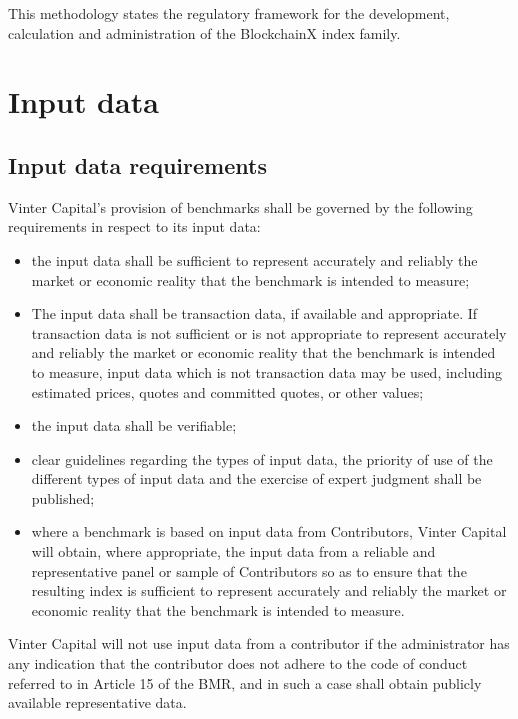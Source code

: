 \documentclass{article}
\begin{document}

This methodology states the regulatory framework for the development, calculation and administration of the BlockchainX index family.

\section{Input data}
\subsection{Input data requirements}
Vinter Capital’s provision of benchmarks shall be governed by the following requirements in respect to its input data:
\newline
\begin{itemize}
    \item the input data shall be sufficient to represent accurately and reliably the market or economic reality that the benchmark is intended to measure;
    \item The input data shall be transaction data, if available and appropriate. If transaction data is not sufficient or is not appropriate to represent accurately and reliably the market or economic reality that the benchmark is intended to measure, input data which is not transaction data may be used, including estimated prices, quotes and committed quotes, or other values;
    \item the input data shall be verifiable; 
    \item clear guidelines regarding the types of input data, the priority of use of the different types of input data and the exercise of expert judgment shall be published;
    \item where a benchmark is based on input data from Contributors, Vinter Capital will obtain, where appropriate, the input data from a reliable and representative panel or sample of Contributors so as to ensure that the resulting index is sufficient to represent accurately and reliably the market or economic reality that the benchmark is intended to measure. 
\end{itemize}
Vinter Capital will not use input data from a contributor if the administrator has any indication that the contributor does not adhere to the code of conduct referred to in Article 15 of the BMR, and in such a case shall obtain publicly available  representative data.
\end{document}
